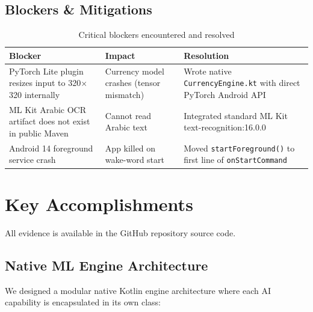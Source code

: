 \documentclass[12pt,a4paper]{article}
\begin{document}
\subsection{Blockers \& Mitigations}
\begin{table}[h]
\centering
\begin{tabular}{p{5cm}p{4cm}p{4cm}}
\toprule
\textbf{Blocker} & \textbf{Impact} & \textbf{Resolution} \\
\midrule
PyTorch Lite plugin resizes input to 320$\times$320 internally & Currency model crashes (tensor mismatch) & Wrote native \texttt{CurrencyEngine.kt} with direct PyTorch Android API \\
\midrule
ML Kit Arabic OCR artifact does not exist in public Maven & Cannot read Arabic text & Integrated standard ML Kit text-recognition:16.0.0 \\
\midrule
Android 14 foreground service crash & App killed on wake-word start & Moved \texttt{startForeground()} to first line of \texttt{onStartCommand} \\
\bottomrule
\end{tabular}
\caption{Critical blockers encountered and resolved}
\end{table}

\section{Key Accomplishments}

All evidence is available in the GitHub repository source code.

\subsection{Native ML Engine Architecture}
We designed a modular native Kotlin engine architecture where each AI capability is encapsulated in its own class:
\end{document}
